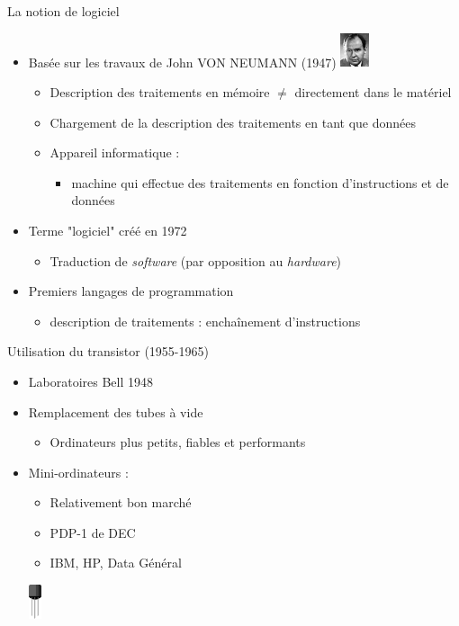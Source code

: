 \begin{frame}{La notion de logiciel \cite{wp-neumann}}
\begin{itemize}
\item<1-2> Basée sur les travaux de John VON NEUMANN (1947) \includegraphics[height=1cm]{../illustration/JohnvonNeumann-LosAlamos.jpg}
\begin{itemize}
\item Description des traitements en mémoire $\ne$ directement dans le matériel
\item Chargement de la description des traitements en tant que données
\item <2>Appareil informatique :
  \begin{itemize}
    \item machine qui effectue des traitements en fonction d'instructions et de données
  \end{itemize}
\end{itemize}
\item<3> Terme "logiciel" créé en 1972
\begin{itemize}
\item Traduction de \textit{software} (par opposition au \textit{hardware})
\end{itemize}
\item<3> Premiers langages de programmation
\begin{itemize}
\item description de traitements : enchaînement d'instructions
\end{itemize}
\end{itemize}

\end{frame}

\begin{frame}{Utilisation du transistor (1955-1965)}
\begin{itemize}
\item Laboratoires Bell 1948
\item Remplacement des tubes à vide
\begin{itemize}
\item Ordinateurs plus petits, fiables et performants
\end{itemize}
\item Mini-ordinateurs :
\begin{itemize}
\item Relativement bon marché
\item PDP-1 de DEC
\item IBM, HP, Data Général
\end{itemize}
	\begin{center}
	\includegraphics[height=1cm,bb=0 0 95 257]{../illustration/transistor.png}
	\end{center}
\end{itemize}
\end{frame}

